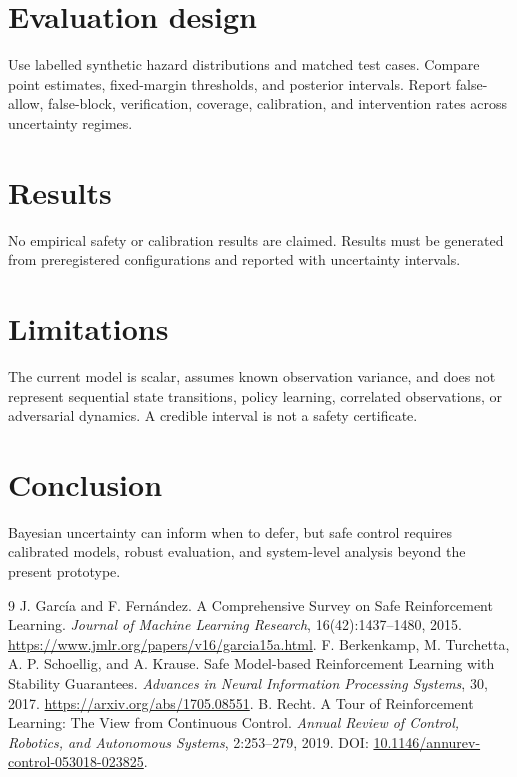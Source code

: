 \documentclass[11pt]{article}
\begin{document}
\section{Evaluation design}
Use labelled synthetic hazard distributions and matched test cases. Compare point estimates, fixed-margin thresholds, and posterior intervals. Report false-allow, false-block, verification, coverage, calibration, and intervention rates across uncertainty regimes.
\section{Results}
No empirical safety or calibration results are claimed. Results must be generated from preregistered configurations and reported with uncertainty intervals.
\section{Limitations}
The current model is scalar, assumes known observation variance, and does not represent sequential state transitions, policy learning, correlated observations, or adversarial dynamics. A credible interval is not a safety certificate.
\section{Conclusion}
Bayesian uncertainty can inform when to defer, but safe control requires calibrated models, robust evaluation, and system-level analysis beyond the present prototype.
\begin{thebibliography}{9}
 J. García and F. Fernández. A Comprehensive Survey on Safe Reinforcement Learning. \textit{Journal of Machine Learning Research}, 16(42):1437--1480, 2015. \url{https://www.jmlr.org/papers/v16/garcia15a.html}.
 F. Berkenkamp, M. Turchetta, A. P. Schoellig, and A. Krause. Safe Model-based Reinforcement Learning with Stability Guarantees. \textit{Advances in Neural Information Processing Systems}, 30, 2017. \url{https://arxiv.org/abs/1705.08551}.
 B. Recht. A Tour of Reinforcement Learning: The View from Continuous Control. \textit{Annual Review of Control, Robotics, and Autonomous Systems}, 2:253--279, 2019. DOI: \href{https://doi.org/10.1146/annurev-control-053018-023825}{10.1146/annurev-control-053018-023825}.
\end{thebibliography}
\end{document}
